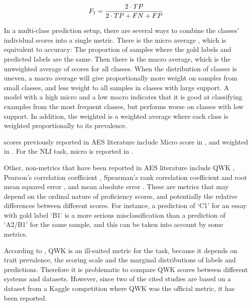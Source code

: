 \begin{equation}\label{eq:fi}
  F_1 = {{2\cdot TP}\over{2\cdot TP + FN + FP}}
\end{equation}

In a multi-class prediction setup, there are several ways to combine the
classes' individual \FI scores into a single metric. There is the micro
average \FI, which is equivalent to accuracy: The proportion of samples where
the gold labels and predicted labels are the same. Then there is the macro
average, which is the unweighted average of \FI scores for all classes. When
the distribution of classes is uneven, a macro average will give
proportionally more weight on samples from small classes, and less weight to
all samples in classes with large support. A model with a high micro \FI and
a low macro \FI indicates that it is good at classifying examples from the
most frequent classes, but performs worse on classes with low support. In
addition, the weighted \FI is a weighted average where each class is weighted
proportionally to its prevalence.

\FI scores previously reported in \ac{AES} literature include Micro \FI score
in \textcite{vajjala17}, and weighted \FI in
\textcite{vajjala18universalCEFR}. For the \ac{NLI} task, micro \FI is
reported in \textcite{malmasi15,malmasi17}.

Other, non-\FI metrics that have been reported in \ac{AES} literature include
\ac{QWK} \autocite{taghipour16, alikaniotis2016automatic}, Pearson's
correlation coefficient \autocite{vajjala17, alikaniotis2016automatic},
Spearman's rank correlation coefficient and root mean squared error
\autocite{alikaniotis2016automatic}, and mean absolute error
\autocite{vajjala17}. These are metrics that may depend on the ordinal nature
of proficiency scores, and potentially the relative differences between
different scores. For instance, a prediction of `C1' for an essay with gold
label `B1' is a more serious misclassification than a prediction of `A2/B1'
for the same sample, and this can be taken into account by some metrics.

According to \textcite{yannakoudakis2015evaluating}, \ac{QWK} is an
ill-suited metric for the task, because it depends on trait prevalence, the
scoring scale and the marginal distributions of labels and predictions.
Therefore it is problematic to compare \ac{QWK} scores between different
systems and datasets. However, since two of the cited studies are based on
a dataset from a Kaggle competition where \ac{QWK} was the official metric,
it has been reported.


